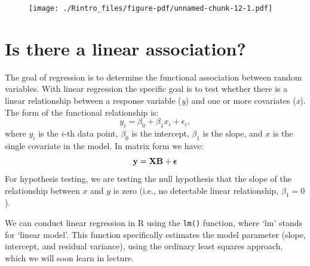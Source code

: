 \documentclass[
  letterpaper,
  DIV=11,
  numbers=noendperiod]{scrreprt}
\newenvironment{Shaded}{\begin{snugshade}}{\end{snugshade}}
\newcommand{\AttributeTok}[1]{\textcolor[rgb]{0.40,0.45,0.13}{#1}}
\newcommand{\CommentTok}[1]{\textcolor[rgb]{0.37,0.37,0.37}{#1}}
\newcommand{\DecValTok}[1]{\textcolor[rgb]{0.68,0.00,0.00}{#1}}
\newcommand{\FunctionTok}[1]{\textcolor[rgb]{0.28,0.35,0.67}{#1}}
\newcommand{\NormalTok}[1]{\textcolor[rgb]{0.00,0.23,0.31}{#1}}
\newcommand{\SpecialCharTok}[1]{\textcolor[rgb]{0.37,0.37,0.37}{#1}}
\newcommand{\StringTok}[1]{\textcolor[rgb]{0.13,0.47,0.30}{#1}}
\begin{document}
\begin{Shaded}
\end{Shaded}

\begin{figure}[H]

{\centering \texttt{[image: ./Rintro\_files/figure-pdf/unnamed-chunk-12-1.pdf]}

}

\end{figure}

\hypertarget{is-there-a-linear-association}{%
\section{Is there a linear
association?}\label{is-there-a-linear-association}}

The goal of regression is to determine the functional association
between random variables. With linear regression the specific goal is to
test whether there is a linear relationship between a response variable
(\emph{y}) and one or more covariates (\emph{x}). The form of the
functional relationship is:
\[y_i = \beta_0 + \beta_1 x_i + \epsilon_i ,\] where \(y_i\) is the
\(i\)-th data point, \(\beta_0\) is the intercept, \(\beta_1\) is the
slope, and \(x\) is the single covariate in the model. In matrix form we
have: \[\bf{y} = \bf{X} \bf{B} + \boldsymbol\epsilon\] For hypothesis
testing, we are testing the null hypothesis that the slope of the
relationship between \(x\) and \(y\) is zero (i.e., no detectable linear
relationship, \(\beta_1 = 0\)).

We can conduct linear regression in R using the \texttt{lm()} function,
where `lm' stands for `linear model'. This function specifically
estimates the model parameter (slope, intercept, and residual variance),
using the ordinary least squares approach, which we will soon learn in
lecture.
\end{document}
